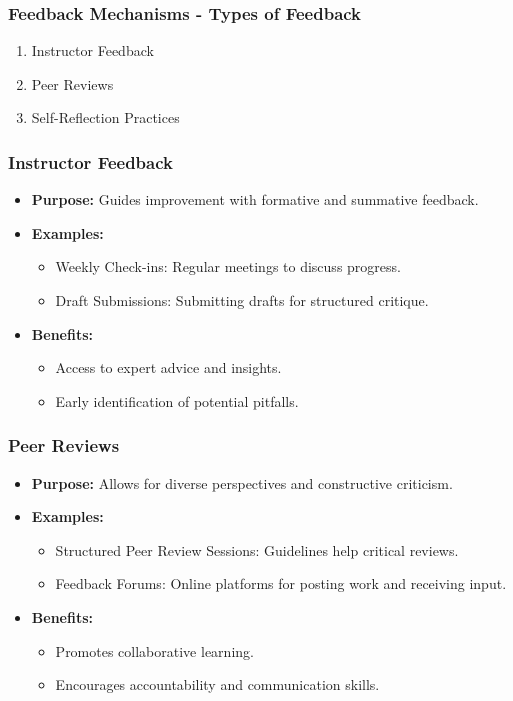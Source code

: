 \documentclass{beamer}
\begin{document}
\begin{frame}[fragile]
    \frametitle{Feedback Mechanisms - Types of Feedback}
    \begin{enumerate}
        \item Instructor Feedback
        \item Peer Reviews
        \item Self-Reflection Practices
    \end{enumerate}
\end{frame}

\begin{frame}[fragile]
    \frametitle{Instructor Feedback}
    \begin{itemize}
        \item \textbf{Purpose:} Guides improvement with formative and summative feedback.
        \item \textbf{Examples:}
            \begin{itemize}
                \item Weekly Check-ins: Regular meetings to discuss progress.
                \item Draft Submissions: Submitting drafts for structured critique.
            \end{itemize}
        \item \textbf{Benefits:}
            \begin{itemize}
                \item Access to expert advice and insights.
                \item Early identification of potential pitfalls.
            \end{itemize}
    \end{itemize}
\end{frame}

\begin{frame}[fragile]
    \frametitle{Peer Reviews}
    \begin{itemize}
        \item \textbf{Purpose:} Allows for diverse perspectives and constructive criticism.
        \item \textbf{Examples:}
            \begin{itemize}
                \item Structured Peer Review Sessions: Guidelines help critical reviews.
                \item Feedback Forums: Online platforms for posting work and receiving input.
            \end{itemize}
        \item \textbf{Benefits:}
            \begin{itemize}
                \item Promotes collaborative learning.
                \item Encourages accountability and communication skills.
            \end{itemize}
    \end{itemize}
\end{frame}
\end{document}
